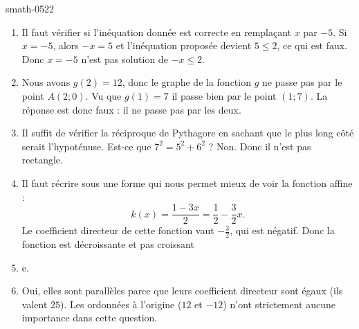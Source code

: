 
\begin{corrige}{smath-0522}

    \begin{enumerate}
        \item
            Il faut vérifier si l'inéquation donnée est correcte en remplaçant \( x\) par \( -5\). Si \( x=-5\), alors \( -x=5\) et l'inéquation proposée devient \( 5\leq 2\), ce qui est faux. Donc \( x=-5\) n'est pas solution de \( -x\leq 2\).

        \item
            Nous avons \( g(2)=12\), donc le graphe de la fonction \( g\) ne passe pas par le point \( A(2;0)\). Vu que \( g(1)=7\) il passe bien par le point \( (1;7)\). La réponse est donc faux : il ne passe pas par les deux.
        \item
            Il suffit de vérifier la réciproque de Pythagore en sachant que le plus long côté serait l'hypoténuse. Est-ce que \( 7^2=5^2+6^2\) ? Non. Donc il n'est pas rectangle.
        \item
            Il faut récrire sous une forme qui nous permet mieux de voir la fonction affine :
            \begin{equation}
                k(x)=\frac{ 1-3x }{ 2 }=\frac{ 1 }{2}-\frac{ 3 }{2}x.
            \end{equation}
            Le coefficient directeur de cette fonction vaut \( -\frac{ 3 }{2}\), qui est négatif. Donc la fonction est décroissante et pas croissant\item e. 
            \item
                Oui, elles sont parallèles parce que leurs coefficient directeur sont égaux (ils valent \( 25\)). Les ordonnées à l'origine (\( 12\) et \( -12\)) n'ont strictement aucune importance dans cette question.
    \end{enumerate}

\end{corrige}
